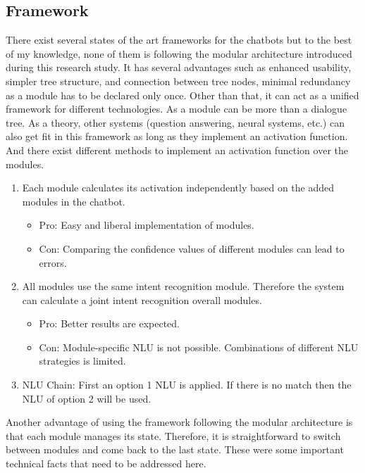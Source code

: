 \subsection{Framework}
There exist several states of the art frameworks for the chatbots but to the best of my knowledge, none of them is following the modular architecture introduced during this research study. It has several advantages such as enhanced usability, simpler tree structure, and connection between tree nodes, minimal redundancy as a module has to be declared only once. Other than that, it can act as a unified framework for different technologies. As a module can be more than a dialogue tree. As a theory, other systems (question answering, neural systems, etc.) can also get fit in this framework as long as they implement an activation function. And there exist different methods to implement an activation function over the modules. 
\begin{enumerate}
    \item Each module calculates its activation independently based on the added modules in the chatbot.
    \begin{itemize}
        \item Pro: Easy and liberal implementation of modules.
        \item Con: Comparing the confidence values of different modules can lead to errors.
    \end{itemize}
    \item All modules use the same intent recognition module. Therefore the system can calculate a joint intent recognition overall modules.
    \begin{itemize}
        \item Pro: Better results are expected.
        \item Con: Module-specific NLU is not possible. Combinations of different NLU strategies is limited.
    \end{itemize}
    \item NLU Chain: First an option 1 NLU is applied. If there is no match then the NLU of option 2 will be used.
\end{enumerate} 
Another advantage of using the framework following the modular architecture is that each module manages its state. Therefore, it is straightforward to switch between modules and come back to the last state. These were some important technical facts that need to be addressed here.
\\~\\
